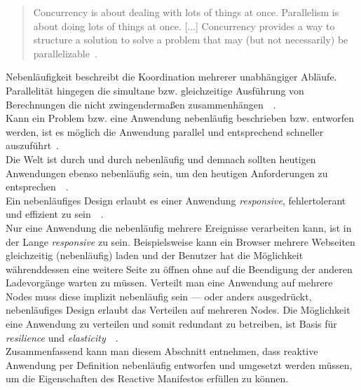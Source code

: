 \begin{quotation}
  Concurrency is about dealing with lots of things at once. Parallelism is about doing lots of things at once. [...] Concurrency provides a way to structure a solution to solve a problem that may (but not necessarily) be parallelizable~.
\cite[S.~10]{pike_concurrency_2012}
\end{quotation}

Nebenläufigkeit beschreibt die Koordination mehrerer unabhängiger Abläufe. Parallelität hingegen die simultane bzw. gleichzeitige Ausführung von Berechnungen die nicht zwingendermaßen zusammenhängen~\cite[S.~8-9]{pike_concurrency_2012}~\cite[S.~3]{butcher_seven_2014}.\\
Kann ein Problem bzw. eine Anwendung nebenläufig beschrieben bzw. entworfen werden, ist es möglich die Anwendung parallel und entsprechend schneller auszuführt~\cite[S.~19~\&~S.~30]{pike_concurrency_2012}.\\

Die Welt ist durch und durch nebenläufig und demnach sollten heutigen Anwendungen ebenso nebenläufig sein, um den heutigen Anforderungen zu entsprechen~\cite[S.~5]{butcher_seven_2014}~\cite[S.~3]{armstrong_programming_2013}.\\
Ein nebenläufiges Design erlaubt es einer Anwendung \textit{responsive}, fehlertolerant und effizient zu sein~\cite[S.~4~\&~S.~6]{butcher_seven_2014}~\cite[S.~6]{armstrong_programming_2013}.\\
Nur eine Anwendung die nebenläufig mehrere Ereignisse verarbeiten kann, ist in der Lange \textit{responsive} zu sein. Beispielsweise kann ein Browser mehrere Webseiten gleichzeitig (nebenläufig) laden und der Benutzer hat die Möglichkeit währenddessen eine weitere Seite zu öffnen ohne auf die Beendigung der anderen Ladevorgänge warten zu müssen. Verteilt man eine Anwendung auf mehrere Nodes muss diese implizit nebenläufig sein --- oder anders ausgedrückt, nebenläufiges Design erlaubt das Verteilen auf mehreren Nodes. Die Möglichkeit eine Anwendung zu verteilen und somit redundant zu betreiben, ist Basis für \textit{resilience} und \textit{elasticity}~\cite[S.~6]{butcher_seven_2014}~\cite[S.~6~\&~S.~7]{armstrong_programming_2013}.\\

Zusammenfassend kann man diesem Abschnitt entnehmen, dass reaktive Anwendung per Definition nebenläufig entworfen und umgesetzt werden müssen, um die Eigenschaften des Reactive Manifestos erfüllen zu können.

